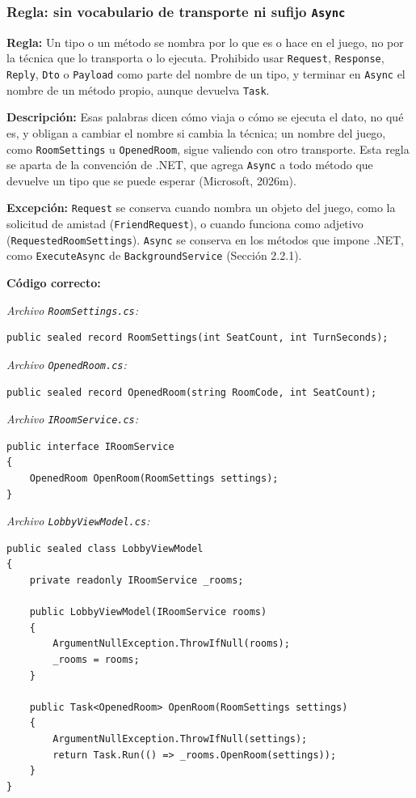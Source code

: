 \subsubsection{Regla: sin vocabulario de transporte ni sufijo \texttt{Async}}

\textbf{Regla:} Un tipo o un método se nombra por lo que es o hace en el juego, no por la técnica que lo transporta o lo ejecuta. Prohibido usar \texttt{Request}, \texttt{Response}, \texttt{Reply}, \texttt{Dto} o \texttt{Payload} como parte del nombre de un tipo, y terminar en \texttt{Async} el nombre de un método propio, aunque devuelva \texttt{Task}.

\textbf{Descripción:} Esas palabras dicen cómo viaja o cómo se ejecuta el dato, no qué es, y obligan a cambiar el nombre si cambia la técnica; un nombre del juego, como \texttt{RoomSettings} u \texttt{OpenedRoom}, sigue valiendo con otro transporte. Esta regla se aparta de la convención de .NET, que agrega \texttt{Async} a todo método que devuelve un tipo que se puede esperar (Microsoft, 2026m).

\textbf{Excepción:} \texttt{Request} se conserva cuando nombra un objeto del juego, como la solicitud de amistad (\texttt{FriendRequest}), o cuando funciona como adjetivo (\texttt{RequestedRoomSettings}). \texttt{Async} se conserva en los métodos que impone .NET, como \texttt{ExecuteAsync} de \texttt{BackgroundService} (Sección 2.2.1).

\textbf{Código correcto:}

\textit{Archivo \texttt{RoomSettings.cs}:}
\begin{lstlisting}[style=csharpstyle]
public sealed record RoomSettings(int SeatCount, int TurnSeconds);
\end{lstlisting}

\textit{Archivo \texttt{OpenedRoom.cs}:}
\begin{lstlisting}[style=csharpstyle]
public sealed record OpenedRoom(string RoomCode, int SeatCount);
\end{lstlisting}

\textit{Archivo \texttt{IRoomService.cs}:}
\begin{lstlisting}[style=csharpstyle]
public interface IRoomService
{
    OpenedRoom OpenRoom(RoomSettings settings);
}
\end{lstlisting}

\textit{Archivo \texttt{LobbyViewModel.cs}:}
\begin{lstlisting}[style=csharpstyle]
public sealed class LobbyViewModel
{
    private readonly IRoomService _rooms;

    public LobbyViewModel(IRoomService rooms)
    {
        ArgumentNullException.ThrowIfNull(rooms);
        _rooms = rooms;
    }

    public Task<OpenedRoom> OpenRoom(RoomSettings settings)
    {
        ArgumentNullException.ThrowIfNull(settings);
        return Task.Run(() => _rooms.OpenRoom(settings));
    }
}
\end{lstlisting}

